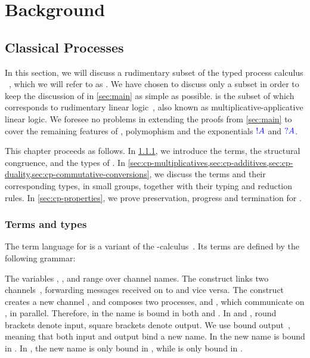 \chapter{Background}
\label{sec:background}

\section{Classical Processes}
\label{sec:cp}
In this section, we will discuss a rudimentary subset of the typed process
calculus \cp~\cite{wadler2012,lindley2015semantics}, which we will refer to as
\rcp. 
We have chosen to discuss only a subset in order to keep the discussion of
\nodcap in \cref{sec:main} as simple as possible.
\rcp is the subset of \cp which corresponds to rudimentary linear
logic~\cite[RLL]{girard1992}, also known as multiplicative-applicative linear
logic. 
We foresee no problems in extending the proofs from \cref{sec:main} to
cover the remaining features of \cp, polymophism and the exponentials $\textcolor{blue}{!A}$
and $\textcolor{blue}{?A}$. 

This chapter proceeds as follows.
In \cref{sec:cp-terms-and-types}, we introduce the terms, the structural
congruence, and the types of \rcp. 
In \cref{sec:cp-multiplicatives,sec:cp-additives,sec:cp-duality,sec:cp-commutative-conversions},
we discuss the terms and their corresponding types, in small groups,
together with their typing and reduction rules.
In \cref{sec:cp-properties}, we prove preservation, progress and
termination for \rcp.

\subsection{Terms and types}
\label{sec:cp-terms-and-types}
The term language for \rcp is a variant of the
\textpi-calculus~\cite{milner1992b}.
Its terms are defined by the following grammar:

The variables , ,  and  range over channel names.
The construct  links two
channels~\cite{sangiorgi1996,boreale1998}, forwarding messages received on
 to  and vice versa.
The construct  creates a new channel , and composes
two processes,  and , which communicate on , in parallel.
Therefore, in  the name  is bound in both  and
.
In  and , round brackets denote
input, square brackets denote output. 
We use bound output~\cite{sangiorgi1996}, meaning that both input and output
bind a new name. 
In  the new name  is bound in .
In , the new name  is only bound in , while
 is only bound in .

